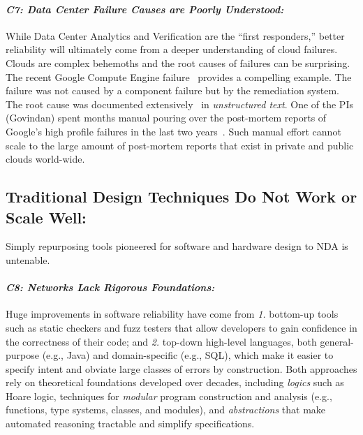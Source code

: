 \paragraph*{\em C7: Data Center Failure Causes are Poorly Understood:}
While Data Center Analytics and Verification are the ``first responders,'' better reliability will ultimately come from a deeper understanding of cloud failures.  Clouds are complex behemoths and the root causes of failures can be surprising. The recent Google Compute Engine failure~\cite{googlefailure} provides a compelling example.  The failure was not caused by a component failure but by the remediation system. The root cause was documented extensively~\cite{googlefailure} in {\em unstructured text}.
One of the PIs (Govindan) spent months manual pouring over the post-mortem reports of Google's high profile failures in the last two years~\cite{rameshgoogle}. Such manual effort cannot scale to the large amount of post-mortem reports that exist in private and  public clouds world-wide.

\subsection{Traditional Design Techniques Do Not Work or Scale Well:}
%
Simply repurposing tools pioneered for software and hardware design to NDA is untenable.

\paragraph{\em C8: Networks Lack Rigorous Foundations:}  Huge improvements in software reliability have come from  {\em 1.} bottom-up tools such as static checkers and fuzz testers that allow developers to gain confidence in the correctness of their code; and {\em 2.} top-down high-level languages, both general-purpose (e.g., Java) and domain-specific (e.g., SQL), which make it easier to specify intent and  obviate large classes of errors by construction. Both approaches rely on theoretical foundations developed over decades, including {\em logics} such as Hoare logic, techniques for {\em modular} program construction and analysis (e.g., functions, type systems, classes, and modules), and {\em abstractions} that make automated reasoning tractable and simplify specifications.

